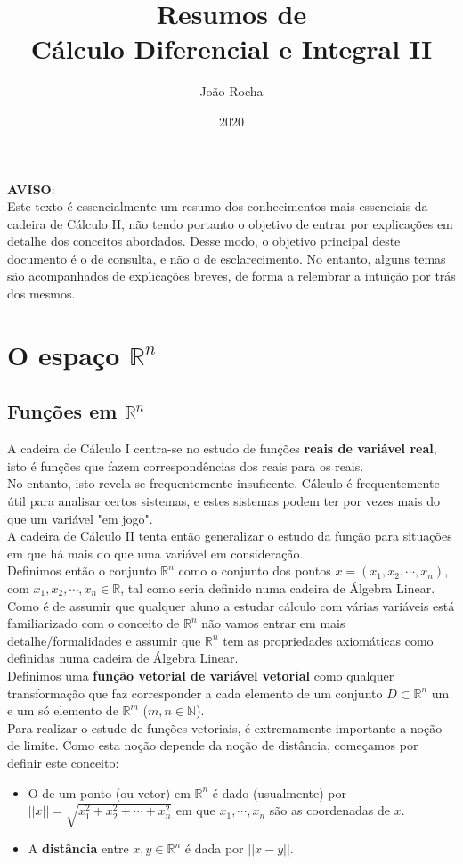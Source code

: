 \documentclass{article}
\title{Resumos de \\ Cálculo Diferencial e Integral II}
\date{2020}
\author{João Rocha}
\begin{document}
\maketitle

\vspace*{\fill}
\textbf{AVISO}:\\ 
Este texto é essencialmente um resumo dos conhecimentos mais essenciais da cadeira de Cálculo II, não tendo portanto o objetivo de entrar por explicações em detalhe dos conceitos abordados. Desse modo, o objetivo principal deste documento é o de consulta, e não o de esclarecimento. No entanto, alguns temas são acompanhados de explicações breves, de forma a relembrar a intuição por trás dos mesmos. 
\newpage

\section{O espaço $\mathbb{R}^n$}
\subsection{Funções em $\mathbb{R}^n$}
A cadeira de Cálculo I centra-se no estudo de funções \textbf{reais de variável real}, isto é funções que fazem correspondências dos reais para os reais.\\
No entanto, isto revela-se frequentemente insuficente. Cálculo é frequentemente útil para analisar certos sistemas, e estes sistemas podem ter por vezes mais do que um variável "em jogo".\\
A cadeira de Cálculo II tenta então generalizar o estudo da função para situações em que há mais do que uma variável em consideração.\\
Definimos então o conjunto $\mathbb{R}^n$ como o conjunto dos pontos $x=(x_1, x_2, \cdots, x_n)$, com $x_1, x_2, \cdots , x_n \in \mathbb{R}$, tal como seria definido numa cadeira de Álgebra Linear. Como é de assumir que qualquer aluno a estudar cálculo com várias variáveis está familiarizado com o conceito de $\mathbb{R}^n$ não vamos entrar em mais detalhe/formalidades e assumir que $\mathbb{R}^n$ tem as propriedades axiomáticas como definidas numa cadeira de Álgebra Linear.\\
Definimos uma \textbf{função vetorial de variável vetorial} como qualquer transformação que faz corresponder a cada elemento de um conjunto $D \subset \mathbb{R}^n$ um e um só elemento de $\mathbb{R}^m$ ($m,n \in \mathbb{N}$).\\
Para realizar o estude de funções vetoriais, é extremamente importante a noção de limite. Como esta noção depende da noção de distância, começamos por definir este conceito:
\begin{itemize}
	\item O  de um ponto (ou vetor) em $\mathbb{R}^n$ é dado (usualmente) por $||x|| = \sqrt{x_1^2 + x_2^2 + \cdots + x_n^2}$ em que $x_1, \cdots , x_n$ são as coordenadas de $x$.
	\item A \textbf{distância} entre $x, y \in \mathbb{R}^n$ é dada por $||x-y||$.
\end{itemize}
\end{document}
